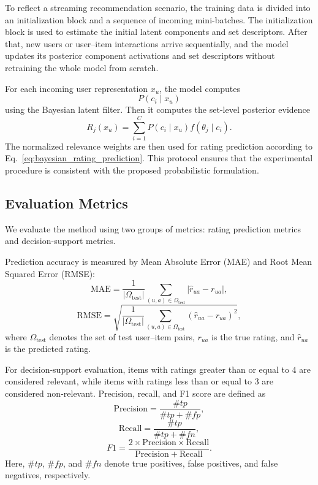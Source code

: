 \documentclass{article}
\theoremstyle{plain}
\theoremstyle{definition}
\theoremstyle{remark}
\begin{document}
To reflect a streaming recommendation scenario, the training data is divided into an initialization block and a sequence of incoming mini-batches. The initialization block is used to estimate the initial latent components and set descriptors. After that, new users or user--item interactions arrive sequentially, and the model updates its posterior component activations and set descriptors without retraining the whole model from scratch.

For each incoming user representation \(x_u\), the model computes
\[
P(c_i\mid x_u)
\]
using the Bayesian latent filter. Then it computes the set-level posterior evidence
\[
R_j(x_u)
=
\sum_{i=1}^{C}
P(c_i\mid x_u)f(\theta_j\mid c_i).
\]
The normalized relevance weights are then used for rating prediction according to Eq.~\eqref{eq:bayesian_rating_prediction}. This protocol ensures that the experimental procedure is consistent with the proposed probabilistic formulation.

\subsection{Evaluation Metrics}
\label{subsec:evaluation_metrics}

We evaluate the method using two groups of metrics: rating prediction metrics and decision-support metrics.

Prediction accuracy is measured by Mean Absolute Error (MAE) and Root Mean Squared Error (RMSE):
\begin{equation}
	\label{eq:mae}
	\mathrm{MAE}
	=
	\frac{1}{|\Omega_{\mathrm{test}}|}
	\sum_{(u,a)\in\Omega_{\mathrm{test}}}
	\left|
	\widehat r_{ua}-r_{ua}
	\right|,
\end{equation}
\begin{equation}
	\label{eq:rmse}
	\mathrm{RMSE}
	=
	\sqrt{
		\frac{1}{|\Omega_{\mathrm{test}}|}
		\sum_{(u,a)\in\Omega_{\mathrm{test}}}
		\left(
		\widehat r_{ua}-r_{ua}
		\right)^2
	},
\end{equation}
where \(\Omega_{\mathrm{test}}\) denotes the set of test user--item pairs, \(r_{ua}\) is the true rating, and \(\widehat r_{ua}\) is the predicted rating.

For decision-support evaluation, items with ratings greater than or equal to \(4\) are considered relevant, while items with ratings less than or equal to \(3\) are considered non-relevant. Precision, recall, and F1 score are defined as
\[
\mathrm{Precision}
=
\frac{\#tp}{\#tp+\#fp},
\]
\[
\mathrm{Recall}
=
\frac{\#tp}{\#tp+\#fn},
\]
\[
F1
=
\frac{2\times \mathrm{Precision}\times \mathrm{Recall}}
{\mathrm{Precision}+\mathrm{Recall}}.
\]
Here, \(\#tp\), \(\#fp\), and \(\#fn\) denote true positives, false positives, and false negatives, respectively.
\end{document}
